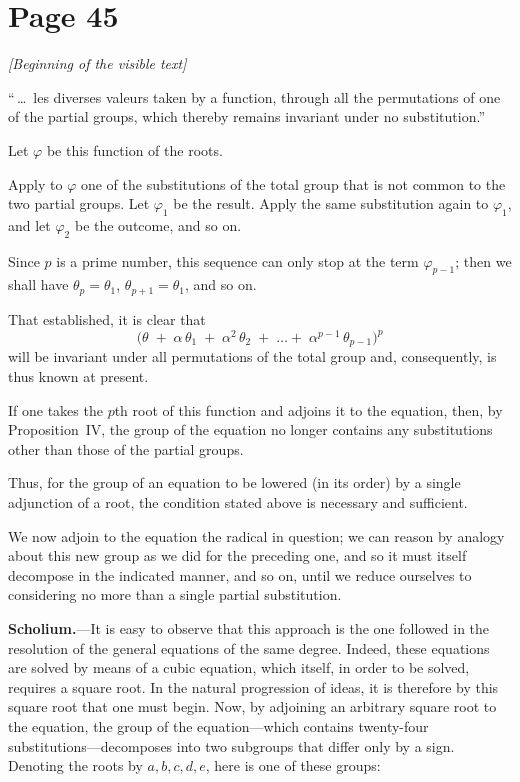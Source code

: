 \documentclass{article}
\begin{document}
\section*{Page 45}

\noindent
\textit{[Beginning of the visible text]}

\noindent
“\,\dots\ les diverses valeurs taken by a function, through all the permutations of one of the partial groups, which thereby remains invariant under no substitution.”

\medskip
\noindent
Let $\varphi$ be this function of the roots.

\noindent
Apply to $\varphi$ one of the substitutions of the total group that is not common to the two partial groups. Let $\varphi_{1}$ be the result. Apply the same substitution again to $\varphi_{1}$, and let $\varphi_{2}$ be the outcome, and so on.

\noindent
Since $p$ is a prime number, this sequence can only stop at the term $\varphi_{p-1}$; then we shall have $\theta_{p} = \theta_{1}$, $\theta_{p+1} = \theta_{1}$, and so on.

\noindent
That established, it is clear that
\[
\bigl(\theta \;+\; \alpha\,\theta_{1}\;+\;\alpha^{2}\,\theta_{2}\;+\;\dots+\;\alpha^{p-1}\,\theta_{p-1}\bigr)^{p}
\]
will be invariant under all permutations of the total group and, consequently, is thus known at present.

\noindent
If one takes the $p$th root of this function and adjoins it to the equation, then, by Proposition~IV, the group of the equation no longer contains any substitutions other than those of the partial groups.

\noindent
Thus, for the group of an equation to be lowered (in its order) by a single adjunction of a root, the condition stated above is necessary and sufficient.

\noindent
We now adjoin to the equation the radical in question; we can reason by analogy about this new group as we did for the preceding one, and so it must itself decompose in the indicated manner, and so on, until we reduce ourselves to considering no more than a single partial substitution.

\medskip
\noindent
\textbf{Scholium.}---It is easy to observe that this approach is the one followed in the resolution of the general equations of the same degree. Indeed, these equations are solved by means of a cubic equation, which itself, in order to be solved, requires a square root. In the natural progression of ideas, it is therefore by this square root that one must begin. Now, by adjoining an arbitrary square root to the equation, the group of the equation---which contains twenty-four substitutions---decomposes into two subgroups that differ only by a sign. Denoting the roots by $a, b, c, d, e$, here is one of these groups:
\end{document}
